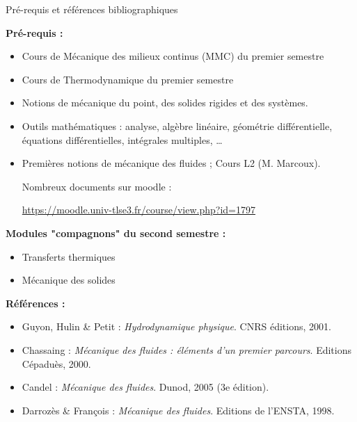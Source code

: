 \begin{frame}{Pré-requis et références bibliographiques}

\small
\textbf{Pré-requis :} \smallskip

\begin{itemize}
\item
	Cours de \textcolor{rouge}{Mécanique des milieux continus} (MMC) du premier semestre
\item
	Cours de Thermodynamique du premier semestre
\item
	Notions de mécanique du point, des solides rigides et des systèmes.

	
	
\item
	Outils mathématiques : analyse, algèbre linéaire, géométrie différentielle, 
	 équations différentielles, intégrales multiples, \ldots
	
	\item 	
	Premières notions de mécanique des fluides ; Cours L2 (M. Marcoux).
	
	Nombreux documents sur moodle :  
	
	{\tiny \url{https://moodle.univ-tlse3.fr/course/view.php?id=1797}}

	
\end{itemize}



\pause

\medskip
\textbf{Modules "compagnons" du second semestre :} \smallskip

\begin{itemize}
\item
	Transferts thermiques 
\item
	Mécanique des solides 
\end{itemize}

\pause

\medskip
\textbf{Références :} \smallskip

\begin{itemize}
\item[] \hspace{-5mm}
	Guyon, Hulin \& Petit : \textsl{Hydrodynamique physique}.
		CNRS éditions, 2001.
\item[] \hspace{-5mm}
	Chassaing : \textsl{Mécanique des fluides : éléments d'un premier parcours}.
		Editions Cépaduès, 2000.
\item[] \hspace{-5mm}
	Candel : \textsl{Mécanique des fluides}. 
		Dunod, 2005 (3e édition).
\item[] \hspace{-5mm}
	Darrozès \& François : \textsl{ Mécanique des fluides}.
		Editions de l'ENSTA, 1998.		
		

\end{itemize}
\end{frame}

